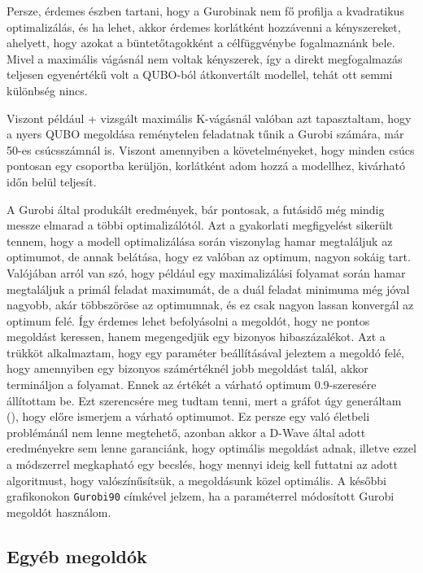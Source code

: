Persze, érdemes észben tartani, hogy a Gurobinak nem fő profilja a kvadratikus optimalizálás, és ha lehet, akkor érdemes korlátként hozzávenni a kényszereket, ahelyett, hogy azokat a büntetőtagokként a célfüggvénybe fogalmaznánk bele. Mivel a maximális vágásnál nem voltak kényszerek, így a direkt megfogalmazás teljesen egyenértékű volt a QUBO-ból átkonvertált modellel, tehát ott semmi különbség nincs.

Viszont például \az+ vizsgált maximális K-vágásnál valóban azt tapasztaltam, hogy a nyers QUBO megoldása reménytelen feladatnak tűnik a Gurobi számára, már 50-es csúcsszámnál is. Viszont amennyiben a követelményeket, hogy minden csúcs pontosan egy csoportba kerüljön, korlátként adom hozzá a modellhez, kivárható időn belül teljesít.

A Gurobi által produkált eredmények, bár pontosak, a futásidő még mindig messze elmarad a többi optimalizálótól. Azt a gyakorlati megfigyelést sikerült tennem, hogy a modell optimalizálása során viszonylag hamar megtaláljuk az optimumot, de annak belátása, hogy ez valóban az optimum, nagyon sokáig tart. 
Valójában arról van szó, hogy például egy maximalizálási folyamat során hamar megtaláljuk a primál feladat maximumát, de a duál feladat minimuma még jóval nagyobb, akár többszöröse az optimumnak, és ez csak nagyon lassan konvergál az optimum felé. Így érdemes lehet befolyásolni a megoldót, hogy ne pontos megoldást keressen, hanem megengedjük egy bizonyos hibaszázalékot. Azt a trükköt alkalmaztam, hogy egy paraméter beállításával jeleztem a megoldó felé, hogy amennyiben egy bizonyos számértéknél jobb megoldást talál, akkor termináljon a folyamat\cite{gurobiBestObjStop}. Ennek az értékét a várható optimum 0.9-szeresére állítottam be. Ezt szerencsére meg tudtam tenni, mert a gráfot úgy generáltam (), hogy előre ismerjem a várható optimumot. Ez persze egy való életbeli problémánál nem lenne megtehető, azonban akkor a D-Wave által adott eredményekre sem lenne garanciánk, hogy optimális megoldást adnak, illetve ezzel a módszerrel megkapható egy becslés, hogy mennyi ideig kell futtatni az adott algoritmust, hogy valószínűsítsük, a megoldásunk közel optimális. A későbbi grafikonokon \verb+Gurobi90+ címkével jelzem, ha a paraméterrel módosított Gurobi megoldót használom.

\subsection{Egyéb megoldók}\label{sec:practiceOthers}

